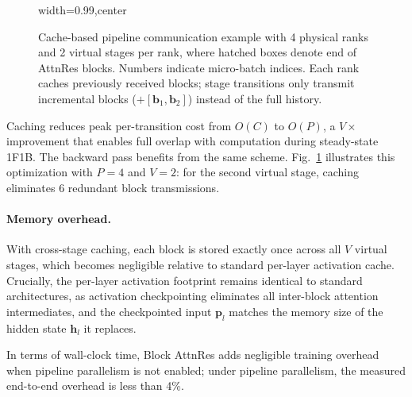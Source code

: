 \begin{figure}[t]
\begin{adjustbox}{width=0.99\textwidth,center}
\begin{tikzpicture}
        \end{tikzpicture}
    \end{adjustbox}
    \caption{
    Cache-based pipeline communication example with 4 physical ranks and 2 virtual stages per rank, where hatched boxes denote end of AttnRes blocks.
    Numbers indicate micro-batch indices. Each rank caches previously received blocks; stage transitions only transmit incremental blocks ($+[\bm{b}_1, \bm{b}_2]$) instead of the full history.
    }
    \label{fig:pipeline}
\end{figure}



Caching reduces peak per-transition cost from $O(C)$ to $O(P)$, a $V{\times}$ improvement that enables full overlap with computation during steady-state 1F1B.
The backward pass benefits from the same scheme. Fig.~\ref{fig:pipeline} illustrates this optimization with $P{=}4$ and $V{=}2$: for the second virtual stage, caching eliminates 6 redundant block transmissions.

\paragraph{Memory overhead.}
With cross-stage caching, each block is stored exactly once across all $V$ virtual stages, which becomes negligible relative to standard per-layer activation cache. Crucially, the per-layer activation footprint remains identical to standard architectures, as activation checkpointing eliminates all inter-block attention intermediates, and the checkpointed input $\bm{p}_l$ matches the memory size of the hidden state $\bm{h}_l$ it replaces.

In terms of wall-clock time, Block AttnRes adds negligible training overhead when pipeline parallelism is not enabled; under pipeline parallelism, the measured end-to-end overhead is less than 4\%.





















